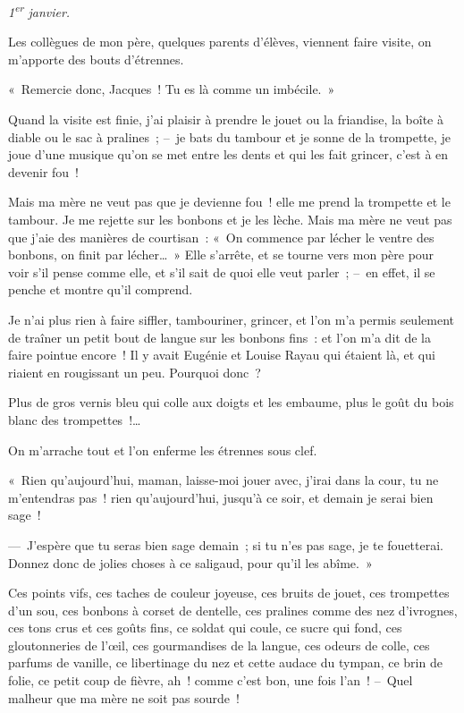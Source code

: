 \documentclass[french,twoside]{book} %
\begin{document}
\noindent \emph{1\textsuperscript{er} janvier.}\par
Les collègues de mon père, quelques parents d’élèves, viennent faire visite, on m’apporte des bouts d’étrennes.\par
« Remercie donc, Jacques ! Tu es là comme un imbécile. »\par
\bigbreak
\noindent Quand la visite est finie, j’ai plaisir à prendre le jouet ou la friandise, la boîte à diable ou le sac à pralines ; – je bats du tambour et je sonne de la trompette, je joue d’une musique qu’on se met entre les dents et qui les fait grincer, c’est à en devenir fou !\par
Mais ma mère ne veut pas que je devienne fou ! elle me prend la trompette et le tambour. Je me rejette sur les bonbons et je les lèche. Mais ma mère ne veut pas que j’aie des manières de courtisan : « On commence par lécher le ventre des bonbons, on finit par lécher… » Elle s’arrête, et se tourne vers mon père pour voir s’il pense comme elle, et s’il sait de quoi elle veut parler ; – en effet, il se penche et montre qu’il comprend.\par
Je n’ai plus rien à faire siffler, tambouriner, grincer, et l’on m’a permis seulement de traîner un petit bout de langue sur les bonbons fins : et l’on m’a dit de la faire pointue encore ! Il y avait Eugénie et Louise Rayau qui étaient là, et qui riaient en rougissant un peu. Pourquoi donc ?\par
Plus de gros vernis bleu qui colle aux doigts et les embaume, plus le goût du bois blanc des trompettes !…\par
On m’arrache tout et l’on enferme les étrennes sous clef.\par
« Rien qu’aujourd’hui, maman, laisse-moi jouer avec, j’irai dans la cour, tu ne m’entendras pas ! rien qu’aujourd’hui, jusqu’à ce soir, et demain je serai bien sage !\par
— J’espère que tu seras bien sage demain ; si tu n’es pas sage, je te fouetterai. Donnez donc de jolies choses à ce saligaud, pour qu’il les abîme. »\par
Ces points vifs, ces taches de couleur joyeuse, ces bruits de jouet, ces trompettes d’un sou, ces bonbons à corset de dentelle, ces pralines comme des nez d’ivrognes, ces tons crus et ces goûts fins, ce soldat qui coule, ce sucre qui fond, ces gloutonneries de l’œil, ces gourmandises de la langue, ces odeurs de colle, ces parfums de vanille, ce libertinage du nez et cette audace du tympan, ce brin de folie, ce petit coup de fièvre, ah ! comme c’est bon, une fois l’an ! – Quel malheur que ma mère ne soit pas sourde !\par
\end{document}
